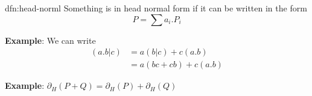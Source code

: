 \documentclass{article}
\begin{document}
\begin{dfn}{dfn:head-norml}{}
    Something is in head normal form if it can be written in the form
    \[P = \sum a_{i} . P_{i}\]
\end{dfn}

\textbf{Example}: We can write
\begin{align*}
    (a.b | c) &= a(b | c) + c(a .b) \\
              &= a(bc + c b) + c(a .b)
\end{align*}

\textbf{Example}: $\partial_{H}(P + Q) = \partial_{H}(P) + \partial_{H}(Q)$
\end{document}
